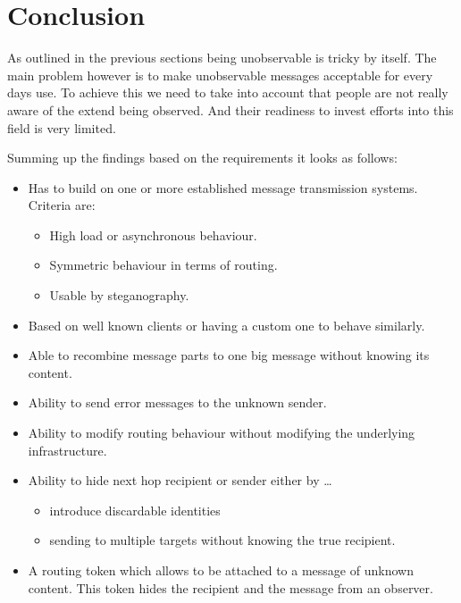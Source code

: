 \documentclass[12pt,journal,compsoc]{IEEEtran}
\begin{document}
\section{Conclusion}
As outlined in the previous sections being unobservable is tricky by itself. The main problem however is to make unobservable messages acceptable for every days use. To achieve this we need to take into account that people are not really aware of the extend being observed. And their readiness to invest efforts into this field is very limited. 
\par
Summing up the findings based on the requirements it looks as follows:
\begin{itemize}
	\item Has to build on one or more established message transmission systems. Criteria are:
	\begin{itemize}
		\item High load or asynchronous behaviour.
		\item Symmetric behaviour in terms of routing.
		\item Usable by steganography.
	\end{itemize} 
	\item Based on well known clients or having a custom one to behave similarly.
	\item Able to recombine message parts to one big message without knowing its content.
	\item Ability to send error messages to the unknown sender.
	\item Ability to modify routing behaviour without modifying the underlying infrastructure.
	\item Ability to hide next hop recipient or sender either by \ldots
	\begin{itemize}
		\item introduce discardable identities
		\item sending to multiple targets without knowing the true recipient.
	\end{itemize}
	\item A routing token which allows to be attached to a message of unknown content. This token hides the recipient and the message from an observer.
\end{itemize}







\end{document}
